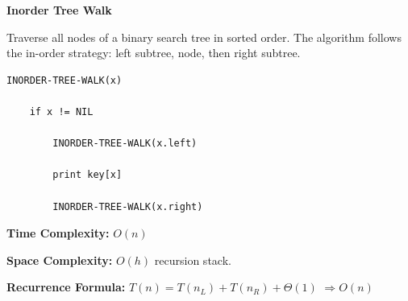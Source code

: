 \documentclass[a4paper,12pt]{article}
\begin{document}
\begin{tcolorbox}[
    colback=gray!30,
    colframe=black,
    boxrule=1pt,
    arc=0mm
]

\begin{tcolorbox}[
    colback=gray!10,
    colframe=black,
    arc=0mm
]
\centering
{\Huge\bfseries Inorder Tree Walk}
\end{tcolorbox}


\begin{tcolorbox}[
    colback=gray!10,
    colframe=black,
    arc=0mm
]
\small
Traverse all nodes of a binary search tree in sorted order.
The algorithm follows the in-order strategy:
left subtree, node, then right subtree.
\end{tcolorbox}


\begin{tcolorbox}[
    colback=black!5,
    colframe=black,
    arc=0mm,
    title=Pseudo-code
]
\tiny
\begin{lstlisting}
INORDER-TREE-WALK(x)

    if x != NIL

        INORDER-TREE-WALK(x.left)

        print key[x]

        INORDER-TREE-WALK(x.right)
\end{lstlisting}
\end{tcolorbox}


\begin{tcolorbox}[
    colback=cyan!20,
    colframe=black,
    arc=0mm
]
\small
\textbf{Time Complexity:}
$O(n)$
\end{tcolorbox}


\begin{tcolorbox}[
    colback=violet!20,
    colframe=black,
    arc=0mm
]
\small
\textbf{Space Complexity:}
$O(h)$ recursion stack.
\end{tcolorbox}


\begin{tcolorbox}[
    colback=pink!20,
    colframe=black,
    arc=0mm
]
\small
\textbf{Recurrence Formula:}
$T(n)=T(n_L)+T(n_R)+\Theta(1)$
$\Rightarrow O(n)$
\end{tcolorbox}

\end{tcolorbox}
\end{document}
